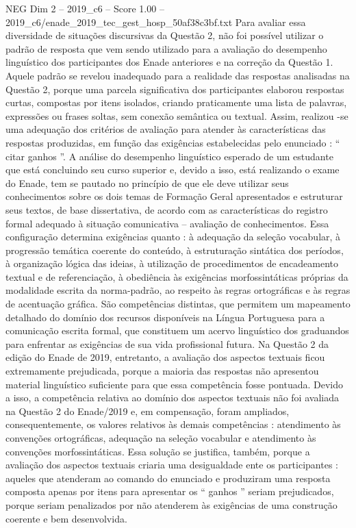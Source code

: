 \begin{textsample}{NEG Dim 2 – 2019\_c6 – Score 1.00 – 2019\_c6/enade\_2019\_tec\_gest\_hosp\_50af38c3bf.txt}
Para avaliar essa diversidade de situações discursivas da Questão 2, não foi possível utilizar o padrão de resposta que vem sendo utilizado para a avaliação do desempenho linguístico dos participantes dos Enade anteriores e na correção da Questão 1.
Aquele padrão se revelou inadequado para a realidade das respostas analisadas na Questão 2, porque uma parcela significativa dos participantes elaborou respostas curtas, compostas por itens isolados, criando praticamente uma lista de palavras, expressões ou frases soltas, sem conexão semântica ou textual.
Assim, realizou -se uma adequação dos critérios de avaliação para atender às características das respostas produzidas, em função das exigências estabelecidas pelo enunciado : “ citar ganhos ”.
A análise do desempenho linguístico esperado de um estudante que está concluindo seu curso superior e, devido a isso, está realizando o exame do Enade, tem se pautado no princípio de que ele deve utilizar seus conhecimentos sobre os dois temas de Formação Geral apresentados e estruturar seus textos, de base dissertativa, de acordo com as características do registro formal adequado à situação comunicativa – avaliação de conhecimentos.
Essa configuração determina exigências quanto : à adequação da seleção vocabular, à progressão temática coerente do conteúdo, à estruturação sintática dos períodos, à organização lógica das ideias, à utilização de procedimentos de encadeamento textual e de referenciação, à obediência às exigências morfossintáticas próprias da modalidade escrita da norma-padrão, ao respeito às regras ortográficas e às regras de acentuação gráfica.
São competências distintas, que permitem um mapeamento detalhado do domínio dos recursos disponíveis na Língua Portuguesa para a comunicação escrita formal, que constituem um acervo linguístico dos graduandos para enfrentar as exigências de sua vida profissional futura.
Na Questão 2 da edição do Enade de 2019, entretanto, a avaliação dos aspectos textuais ficou extremamente prejudicada, porque a maioria das respostas não apresentou material linguístico suficiente para que essa competência fosse pontuada.
Devido a isso, a competência relativa ao domínio dos aspectos textuais não foi avaliada na Questão 2 do Enade/2019 e, em compensação, foram ampliados, consequentemente, os valores relativos às demais competências : atendimento às convenções ortográficas, adequação na seleção vocabular e atendimento às convenções morfossintáticas.
Essa solução se justifica, também, porque a avaliação dos aspectos textuais criaria uma desigualdade ente os participantes : aqueles que atenderam ao comando do enunciado e produziram uma resposta composta apenas por itens para apresentar os “ ganhos ” seriam prejudicados, porque seriam penalizados por não atenderem às exigências de uma construção coerente e bem desenvolvida.

\end{textsample}
